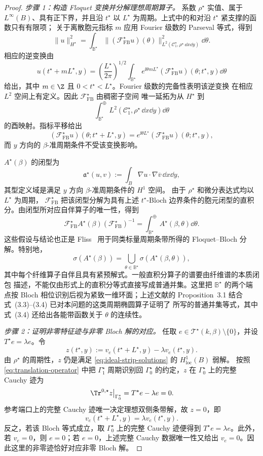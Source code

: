 \begin{proof}
\emph{步骤 1：构造 Floquet 变换并分解理想周期算子。}
系数 $\rho^\star$ 实值、属于 $L^\infty(B)$、具有正下界，并且沿
$t^\star$ 以 $L^\star$ 为周期。上式中的和对沿 $t^\star$ 紧支撑的函数只有有限项；
关于离散胞元指标 $m$ 应用 Fourier 级数的 Parseval 等式，得到
\[
  \lVert u\rVert_{H^\star}^2
  =\int_{\mathbb B^\star}
  \lVert(\mathscr F_{\mathrm{FB}}^\star u)(\theta)\rVert_
  {L^2(\mathcal C_1^\star,\rho^\star\,\dd x\dd y)}^2\dd\theta.
\]
相应的逆变换由
\[
  u(t^\star+mL^\star,y)
  =\left(\frac{L^\star}{2\pi}\right)^{1/2}
  \int_{\mathbb B^\star}e^{\ii\theta mL^\star}
  (\mathscr F_{\mathrm{FB}}^\star u)(\theta;t^\star,y)\dd\theta
\]
给出，其中 $m\in\Z$ 且 $0<t^\star<L^\star$。Fourier 级数的完备性表明该逆变换
在相应 $L^2$ 空间上有定义。因此 $\mathscr F_{\mathrm{FB}}^\star$ 由稠密子空间
唯一延拓为从
$H^\star$ 到
\[
  \int_{\mathbb B^\star}^{\oplus}
  L^2(\mathcal C_1^\star,\rho^\star\,\dd x\dd y)\dd\theta
\]
的酉映射。指标平移给出
\[
  (\mathscr F_{\mathrm{FB}}^\star u)
  (\theta;t^\star+L^\star,y)
  =e^{\ii\theta L^\star}
  (\mathscr F_{\mathrm{FB}}^\star u)(\theta;t^\star,y),
\]
而 $y$ 方向的 $\beta$-准周期条件不受该变换影响。

$A^\star(\beta)$ 的闭型为
\[
  \mathfrak a^\star(u,v)
  :=\int_B\nabla u\cdot\nabla\overline v\,\dd x\dd y,
\]
其型定义域是满足 $y$ 方向 $\beta$-准周期条件的 $H^1$ 空间。
由于 $\rho^\star$ 和微分表达式均以 $L^\star$ 为周期，
$\mathscr F_{\mathrm{FB}}^\star$ 把该闭型分解为具有上述
$t^\star$-Bloch 边界条件的胞元闭型的直积分。由闭型所对应自伴算子的唯一性，得到
\[
  \mathscr F_{\mathrm{FB}}^\star A^\star(\beta)
  (\mathscr F_{\mathrm{FB}}^\star)^{-1}
  =\int_{\mathbb B^\star}^{\oplus}
  A^\star(\beta,\theta)\dd\theta.
\]
这些假设与结论也正是 Fliss~
\cite[Proposition~3.1, especially equations~(3.3)--(3.4)]{Fliss2013}
用于同类标量周期条带所得的 Floquet--Bloch 分解。特别地，
\[
  \sigma(A^\star(\beta))
  =\bigcup_{\theta\in\mathbb B^\star}
  \sigma(A^\star(\beta,\theta)),
\]
其中每个纤维算子自伴且具有紧预解式。一般直积分算子的谱要由纤维谱的本质闭包
描述，不能仅由形式上的直积分等式直接写成普通并集。这里把
$\mathbb B^\star$ 的两个端点按 Bloch 相位识别后视为紧致一维环面；上述文献的
Proposition~3.1 结合式~\textup{(3.3)--(3.4)} 已对本问题的这类周期椭圆算子证明了
所写的普通并集等式，其中式~\textup{(3.4)} 还给出各能带函数关于 $\theta$ 的连续性。

\emph{步骤 2：证明非零特征迹与非零 Bloch 解的对应。}
任取 $e\in\mathscr T^\star(k,\beta)\setminus\{0\}$，并设
$T^\star e=\lambda e$。令
\[
  z(t^\star,y):=
  v_e(t^\star+L^\star,y)-\lambda v_e(t^\star,y).
\]
由 $\rho^\star$ 的周期性，$z$ 仍是满足
\eqref{eq:ideal-strip-solutions} 的 $H^1_{\mathrm{loc}}(B)$ 弱解。
按照 \eqref{eq:translation-operator} 中把 $\Gamma_1^\star$ 周期识别回
$\Gamma_0^\star$ 的约定，$z$ 在 $\Gamma_0^\star$ 上的完整 Cauchy 迹为
\[
  \left.\Tr^{0,\star}z\right|_{\Gamma_0^\star}
  =T^\star e-\lambda e=0.
\]
参考端口上的完整 Cauchy 迹唯一决定理想双侧条带解，故 $z=0$，即
\[
  v_e(t^\star+L^\star,y)=\lambda v_e(t^\star,y).
\]
反之，若该 Bloch 等式成立，取 $\Gamma_0^\star$ 上的完整 Cauchy 迹便得到
$T^\star e=\lambda e$。此外，若 $v_e=0$，则 $e=0$；若 $e=0$，上述完整
Cauchy 数据唯一性又给出 $v_e=0$。因此这里的非零迹恰好对应非零 Bloch 解。


\end{proof}
